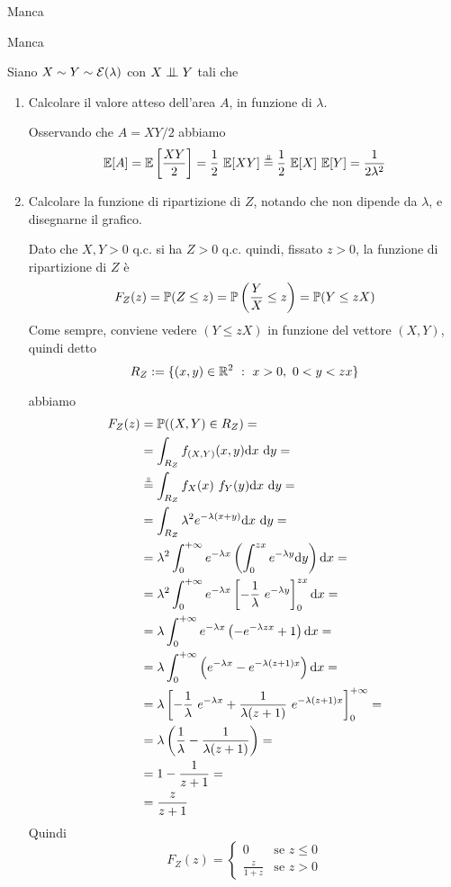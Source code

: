 \Soluzione{}
Manca

\Soluzione{}
Manca

\Soluzione{}
Siano $X\sim Y\sim\mathcal{E}(\lambda)$ con $X\indep Y$ tali che


\begin{enumerate}
\item Calcolare il valore atteso dell'area $A$, in funzione di $\lambda$.

Osservando che $A=XY/2$ abbiamo
\[
\EE[A]=\EE\left[ \frac{XY}{2} \right]=\frac{1}{2}\ \EE[XY]\overset{\underset{\indep}{}}{=}\frac{1}{2}\ \EE[X]\ \EE[Y]=\frac{1}{2\lambda^2}
\]

\item Calcolare la funzione di ripartizione di $Z$, notando che non dipende da $\lambda$, e disegnarne il grafico.

Dato che $X,Y>0$ q.c. si ha $Z>0$ q.c. quindi, fissato $z>0$, la funzione di ripartizione di $Z$ è
\[
F_Z(z)=\mathbb{P}(Z\leq z)=\mathbb{P}\left(\frac{Y}{X}\leq z \right)=\mathbb{P}(Y\leq zX)
\] 
Come sempre, conviene vedere $(Y\leq zX)$ in funzione del vettore $(X,Y)$, quindi detto
\[
R_Z:=\{(x,y)\in\RR^2\ :\ x>0,\ 0<y<zx\}
\]


abbiamo 
\begin{gather*}
\begin{aligned}
F_Z(z)&=\PP((X,Y)\in R_Z)= \\
&=\int_{R_Z}\fXYxy\dxy= \\
&\overset{\underset{\indep}{}}{=}\int_{R_Z}f_X(x)\ f_Y(y)\dxy=\\
&=\int_{R_Z}\lambda^2e^{-\lambda(x+y)}\dxy=\\
&=\lambda^2\intc e^{-\lambda x} \left( \int_0^{zx}e^{-\lambda y}\dy  \right)\dx=\\
&=\lambda^2\intc e^{-\lambda x} \left[-\frac{1}{\lambda}\ e^{-\lambda y}  \right]_0^{zx}\dx=\\
&=\lambda\intc e^{-\lambda x} \left( -e^{-\lambda zx}+1  \right)\dx=\\
&=\lambda\intc \left(e^{-\lambda x} -e^{-\lambda (z+1)x}  \right)\dx=\\
&=\lambda\left[-\frac{1}{\lambda}\ e^{-\lambda x}+\frac{1}{\lambda(z+1)}\ e^{-\lambda (z+1)x}  \right]_0^{+\infty}=\\
&=\lambda\left(\frac{1}{\lambda}-\frac{1}{\lambda(z+1)} \right)=\\
&=1-\frac{1}{z+1}=\\
&=\frac{z}{z+1}
\end{aligned}
\end{gather*}
Quindi
\[
F_Z(z)=
\begin{cases}
0 &\text{se }z\leq 0 \\
\displaystyle\frac{z}{1+z} &\text{se }z>0
\end{cases}
\]


\end{enumerate}
